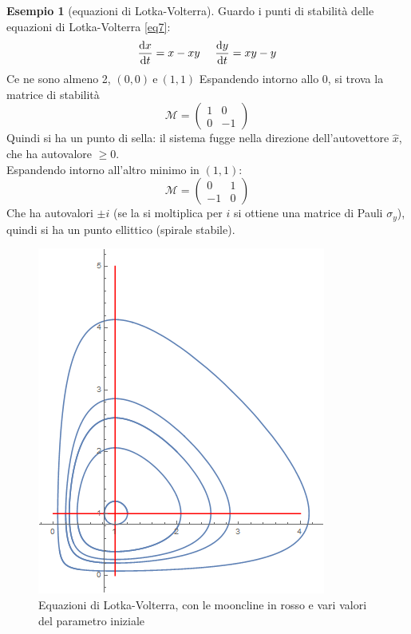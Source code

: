 \documentclass[a4paper,12pt]{article}
\theoremstyle{plain}
\theoremstyle{definition}
\newtheorem{exmp}{Esempio}[section]
\newcommand{\Op}[1]{\mathcal{#1}}
\newcommand{\econg}{~\text{e}~}
\theoremstyle{remark}
\begin{document}
\begin{exmp}[equazioni di Lotka-Volterra]
Guardo i punti di stabilità delle equazioni di Lotka-Volterra \ref{eq7}: \[\dv{x}{t}=x-x y\:\:\:\:\:\:
\dv{y}{t}=x y-y\]Ce ne sono almeno 2, $(0,0)\econg(1,1)$
Espandendo intorno allo 0, si trova la matrice di stabilità
\[\Op{M}=\begin{pmatrix}
1 &0\\ 
0 & -1
\end{pmatrix} \] 
Quindi si ha un punto di sella: il sistema fugge nella direzione dell'autovettore $\hat{x}$, che ha autovalore $\ge0 $.\\
Espandendo intorno all'altro minimo in  $(1,1)$:
\[\Op{M}=\begin{pmatrix}
0 &1\\ 
-1 & 0
\end{pmatrix} \]
Che ha autovalori $\pm i$ (se la si moltiplica per $i$ si ottiene una matrice di Pauli $\sigma_y$), quindi si ha un punto ellittico (spirale stabile). 
\begin{figure}[h]
	\centering
	\includegraphics[scale=0.4]{lotka2.png}
	\caption{Equazioni di Lotka-Volterra, con le mooncline in rosso e vari valori del parametro iniziale}
\end{figure}
\end{exmp}
\end{document}
